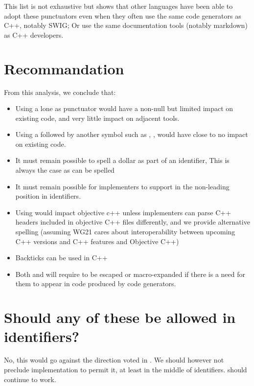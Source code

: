 \documentclass{wg21}
\begin{document}
    This list is not exhaustive but shows that other languages have been able to adopt these punctuators even when they often use the same code generators as C++, notably SWIG; Or use the same
    documentation tools (notably markdown) as C++ developers.
    
    
    \section{Recommandation}
    
    From this analysis, we conclude that:
    
    \begin{itemize}
        \item Using a lone \tcode{\$} as punctuator would have a non-null but limited impact on existing code, and very little impact on adjacent tools.
        \item Using a \tcode{\$} followed by another symbol such as \tcode{\{}, \tcode{[}, \tcode{(} would have close to no impact on existing code.
        \item It must remain possible to spell a dollar as part of an identifier, This is always the case as \tcode{\$} can be spelled 
        \item It must remain possible for implementers to support \tcode{\$} in the non-leading position in identifiers.
        \item Using  would impact objective c++ unless implementers can parse C++ headers included in objective C++ files differently, and we provide alternative spelling (assuming WG21 cares about interoperability between upcoming C++ versions and C++ features and Objective C++)
        \item Backticks can be used in C++
        \item Both \tcode{\$} and  will require to be escaped or macro-expanded if there is a need for them to appear in code produced by code generators.
    \end{itemize}
    
    \section{Should any of these be allowed in identifiers?}
    
    No, this would go against the direction voted in .
    We should however not preclude implementation to permit it, at least in the middle of identifiers.  should continue to work.
    
\end{document}
